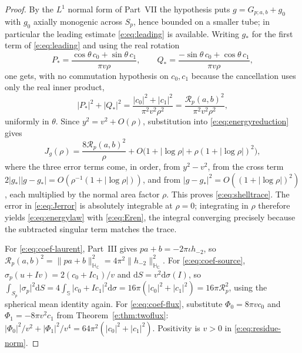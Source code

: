 \documentclass[11pt,a4paper]{article}
\numberwithin{equation}{section}
\theoremstyle{definition}
\theoremstyle{remark}
\theoremstyle{plain}
\newcommand{\HC}{\mathbb H_{\mathbb C}}
\newcommand{\SSS}{\mathbb S}
\newcommand{\Sp}{S_{p}}
\newcommand{\Rp}{\mathcal R_{p}}      %
\newcommand{\Jg}{J_{g}}
\newcommand{\abs}[1]{\lvert #1\rvert}
\newcommand{\norm}[1]{\lVert #1\rVert}
\newcommand{\dd}{\mathrm d}
\begin{document}
\begin{proof}
By the $L^1$ normal form of Part~VII the hypothesis puts
$g=G_{p;a,b}+g_0$ with $g_0$ axially monogenic across $\Sp$, hence
bounded on a smaller tube; in particular the leading estimate
\eqref{e:eq:leading} is available. Writing $g_*$ for the first term of
\eqref{e:eq:leading} and using the real rotation
\[
 P_*=\frac{\cos\theta\,c_0+\sin\theta\,c_1}{\pi v\rho},
 \qquad
 Q_*=\frac{-\sin\theta\,c_0+\cos\theta\,c_1}{\pi v\rho},
\]
one gets, with no commutation hypothesis on $c_0,c_1$ because the
cancellation uses only the real inner product,
\begin{equation}
 \abs{P_*}^2+\abs{Q_*}^2
 =\frac{\abs{c_0}^2+\abs{c_1}^2}{\pi^2v^2\rho^2}
 =\frac{\Rp(a,b)^2}{\pi^2v^2\rho^2},
 \label{e:eq:leadingnorm}
\end{equation}
uniformly in $\theta$. Since $y^2=v^2+O(\rho)$, substitution into
\eqref{e:eq:energyreduction} gives
\begin{equation}
 \Jg(\rho)=\frac{8\Rp(a,b)^2}{\rho}
   +O\bigl(1+\abs{\log\rho}+\rho(1+\abs{\log\rho})^2\bigr),
 \label{e:eq:Jerror}
\end{equation}
where the three error terms come, in order, from $y^2-v^2$, from the
cross term $2\abs{g_*}\abs{g-g_*}=O(\rho^{-1}(1+\abs{\log\rho}))$, and
from $\abs{g-g_*}^2=O((1+\abs{\log\rho})^2)$, each multiplied by the
normal area factor $\rho$. This proves \eqref{e:eq:shelltrace}. The error
in \eqref{e:eq:Jerror} is absolutely integrable at $\rho=0$; integrating
in $\rho$ therefore yields \eqref{e:eq:energylaw} with
\eqref{e:eq:Eren}, the integral converging precisely because the
subtracted singular term matches the trace.

For \eqref{e:eq:coef-laurent}, Part~III gives $pa+b=-2\pi\iota h_{-2}$,
so $\Rp(a,b)^2=\norm{pa+b}_{\HC}^2=4\pi^2\norm{h_{-2}}_{\HC}^2$. For
\eqref{e:eq:coef-source}, $\sigma_p(u+Iv)=2(c_0+Ic_1)/v$ and
$\dd S=v^2\dd\sigma(I)$, so
$\int_{\Sp}\abs{\sigma_p}^2\dd S=4\int_{\SSS}\abs{c_0+Ic_1}^2\dd\sigma
=16\pi(\abs{c_0}^2+\abs{c_1}^2)=16\pi\Rp^2$, using the spherical mean
identity again. For \eqref{e:eq:coef-flux}, substitute
$\Phi_0=8\pi vc_0$ and $\Phi_1=-8\pi v^2c_1$ from
Theorem~\ref{e:thm:twoflux}:
$\abs{\Phi_0}^2/v^2+\abs{\Phi_1}^2/v^4=64\pi^2(\abs{c_0}^2+\abs{c_1}^2)$.
Positivity is $v>0$ in \eqref{e:eq:residue-norm}.
\end{proof}
\end{document}
